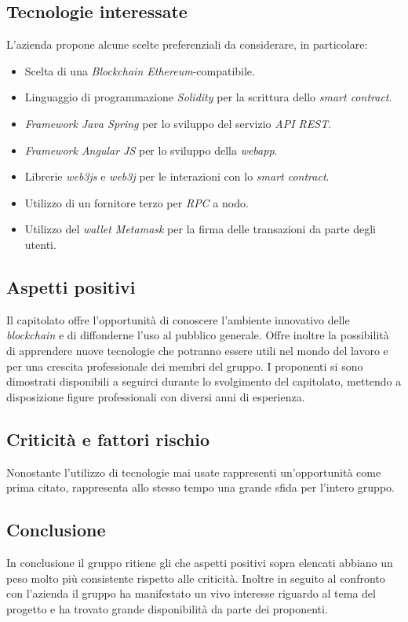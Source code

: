 \subsection{Tecnologie interessate}
L’azienda propone alcune scelte preferenziali da considerare, in particolare:
\begin{itemize}
    \item Scelta di una \textit{Blockchain Ethereum}-compatibile.
    \item Linguaggio di programmazione \textit{Solidity} per la scrittura dello \textit{smart contract}.
    \item \textit{Framework Java Spring} per lo sviluppo del servizio \textit{API REST}.
    \item \textit{Framework Angular JS} per lo sviluppo della \textit{webapp}.
    \item Librerie \textit{web3js} e \textit{web3j} per le interazioni con lo \textit{smart contract}.
    \item Utilizzo di un fornitore terzo per \textit{RPC} a nodo.
    \item Utilizzo del \textit{wallet Metamask} per la firma delle transazioni da parte degli utenti.
\end{itemize}

\subsection{Aspetti positivi}
Il capitolato offre l’opportunità di conoscere l'ambiente innovativo delle \textit{blockchain} e di diffonderne l'uso al pubblico generale.
Offre inoltre la possibilità di apprendere nuove tecnologie che potranno essere utili nel mondo del lavoro e per una crescita professionale dei membri del gruppo.\newline
I proponenti si sono dimostrati disponibili a seguirci durante lo svolgimento del capitolato, mettendo a disposizione figure professionali con diversi anni di esperienza.


\subsection{Criticità e fattori rischio}
Nonostante l’utilizzo di tecnologie mai usate rappresenti un’opportunità come prima citato, rappresenta allo stesso tempo una grande sfida per l’intero gruppo.
\subsection{Conclusione}
In conclusione il gruppo ritiene gli che aspetti positivi sopra elencati abbiano un peso molto più consistente rispetto alle criticità.
Inoltre in seguito al confronto con l’azienda il gruppo ha manifestato un vivo interesse riguardo al tema del progetto e ha trovato grande disponibilità da parte dei proponenti.

